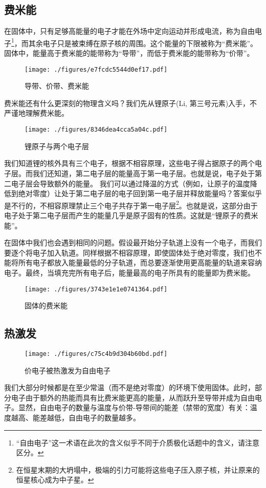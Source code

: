 \subsection{费米能}
在固体中，只有足够高能量的电子才能在外场中定向运动并形成电流，称为自由电子\footnote{“自由电子”这一术语在此次的含义似乎不同于介质极化话题中的含义，请注意区分。}，而其余电子只是被束缚在原子核的周围。这个能量的下限被称为“费米能”。固体中，能量高于费米能的能带称为“导带”，而低于费米能的能带称为“价带”。
\begin{figure}[ht]
\centering
\texttt{[image: ./figures/e7fcdc5544d0ef17.pdf]}
\caption{导带、价带、费米能} \label{fig_BNDGP_5}
\end{figure}

费米能还有什么更深刻的物理含义吗？我们先从锂原子(Li, 第三号元素)入手，不严谨地理解费米能。
\begin{figure}[ht]
\centering
\texttt{[image: ./figures/8346dea4cca5a04c.pdf]}
\caption{锂原子与两个电子层} \label{fig_BNDGP_6}
\end{figure}
我们知道锂的核外具有三个电子，根据不相容原理，这些电子得占据原子的两个电子层。而我们还知道，第二电子层的能量高于第一电子层。也就是说，电子处于第二电子层会导致额外的能量。
我们可以通过降温的方式（例如，让原子的温度降低到绝对零度）让处于第二电子层的电子回到第一电子层并释放能量吗？答案似乎是不行的，不相容原理禁止三个电子共存于第一电子层\footnote{在恒星末期的大坍塌中，极端的引力可能将这些电子压入原子核，并让原来的恒星核心成为中子星。}。也就是说，这部分由于电子处于第二电子层而产生的能量几乎是原子固有的性质。这就是“锂原子的费米能”。

在固体中我们也会遇到相同的问题。假设最开始分子轨道上没有一个电子，而我们要逐个将电子加入轨道。同样根据不相容原理，即使固体处于绝对零度，我们也不能将所有电子都放入能量最低的分子轨道，而总要逐渐使用更高能量的轨道来容纳电子。最终，当填充完所有电子后，能量最高的电子所具有的能量即为费米能。
\begin{figure}[ht]
\centering
\texttt{[image: ./figures/3743e1e1e0741364.pdf]}
\caption{固体的费米能} \label{fig_BNDGP_7}
\end{figure}

\subsection{热激发}
\begin{figure}[ht]
\centering
\texttt{[image: ./figures/c75c4b9d304b60bd.pdf]}
\caption{价电子被热激发为自由电子} \label{fig_BNDGP_8}
\end{figure}
我们大部分时候都是在至少常温（而不是绝对零度）的环境下使用固体。此时，部分电子由于额外的热能而具有比费米能更高的能量，从而跃升至导带并成为自由电子。显然，自由电子的数量与温度与价带-导带间的能差（禁带的宽度）有关：温度越高、能差越低，自由电子的数量越多。

